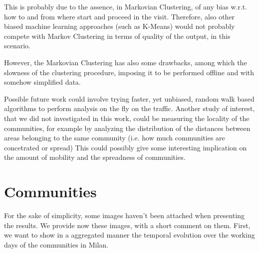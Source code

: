 \documentclass[12pt,a4paper]{article}
\begin{document}
This is probably due to the assence, in Markovian Clustering, of any bias w.r.t. how to and from where start
and proceed in the visit. Therefore, also other biased machine learning
approaches (such as K-Means) would not probably compete with Markov
Clustering in terms of quality of the output, in this scenario.

However, the Markovian Clustering has also some drawbacks, among which the slowness of the clustering procedure,
imposing it to be performed offline and with somehow simplified data. 

Possible future work could involve trying faster, yet unbiased, random walk based algorithms to perform
analysis on the fly on the traffic. Another study of interest, that we did not investigated in this work, could be
measuring the locality of the communities, for example by analyzing the distribution of the distances between areas
belonging to the same community (i.e. how much communities are concetrated or spread)
This could possibly give some interesting implication on the amount of mobility and the spreadness of communities.
\newpage

\appendix
\section{Communities}
\label{communities}
For the sake of simplicity, some images haven't been attached when presenting the results. We provide now these images, with a short comment on them.
First, we want to show in a aggregated manner the temporal evolution over the working days of the communities in Milan.
\end{document}
